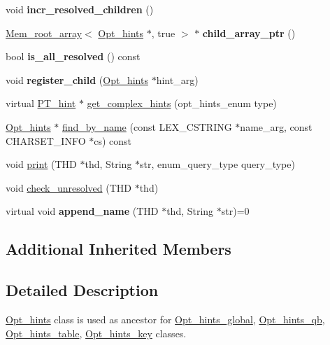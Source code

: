 \begin{DoxyCompactItemize}
\mbox{\label{classOpt__hints_a6f56b14236ddfad6efdac25e932c5cd7}} 
void {\bfseries incr\+\_\+resolved\+\_\+children} ()
\item 
\mbox{\label{classOpt__hints_af804e6f6d44aa881622d564b1e9028bd}} 
\mbox{\hyperlink{classMem__root__array}{Mem\+\_\+root\+\_\+array}}$<$ \mbox{\hyperlink{classOpt__hints}{Opt\+\_\+hints}} $\ast$, true $>$ $\ast$ {\bfseries child\+\_\+array\+\_\+ptr} ()
\item 
\mbox{\label{classOpt__hints_a2038b69f72475ff9dd2511b755eba38c}} 
bool {\bfseries is\+\_\+all\+\_\+resolved} () const
\item 
\mbox{\label{classOpt__hints_a7ee34cdc3e966883222b185f665b62ea}} 
void {\bfseries register\+\_\+child} (\mbox{\hyperlink{classOpt__hints}{Opt\+\_\+hints}} $\ast$hint\+\_\+arg)
\item 
virtual \mbox{\hyperlink{classPT__hint}{P\+T\+\_\+hint}} $\ast$ \mbox{\hyperlink{classOpt__hints_a3dd8eb290a7b81d9a6d849de18a61cba}{get\+\_\+complex\+\_\+hints}} (opt\+\_\+hints\+\_\+enum type)
\item 
\mbox{\hyperlink{classOpt__hints}{Opt\+\_\+hints}} $\ast$ \mbox{\hyperlink{classOpt__hints_a87c03b089de34abc1e119297e1126f42}{find\+\_\+by\+\_\+name}} (const L\+E\+X\+\_\+\+C\+S\+T\+R\+I\+NG $\ast$name\+\_\+arg, const C\+H\+A\+R\+S\+E\+T\+\_\+\+I\+N\+FO $\ast$cs) const
\item 
void \mbox{\hyperlink{classOpt__hints_a76b7bcc9463fc5fb053d22a56ca488be}{print}} (T\+HD $\ast$thd, String $\ast$str, enum\+\_\+query\+\_\+type query\+\_\+type)
\item 
void \mbox{\hyperlink{classOpt__hints_ab8841b8df145a91508a091c59046f162}{check\+\_\+unresolved}} (T\+HD $\ast$thd)
\item 
\mbox{\label{classOpt__hints_a8cdecb76130a9a3ce77055cbf2bafb0a}} 
virtual void {\bfseries append\+\_\+name} (T\+HD $\ast$thd, String $\ast$str)=0
\end{DoxyCompactItemize}
\subsection*{Additional Inherited Members}


\subsection{Detailed Description}
\mbox{\hyperlink{classOpt__hints}{Opt\+\_\+hints}} class is used as ancestor for \mbox{\hyperlink{classOpt__hints__global}{Opt\+\_\+hints\+\_\+global}}, \mbox{\hyperlink{classOpt__hints__qb}{Opt\+\_\+hints\+\_\+qb}}, \mbox{\hyperlink{classOpt__hints__table}{Opt\+\_\+hints\+\_\+table}}, \mbox{\hyperlink{classOpt__hints__key}{Opt\+\_\+hints\+\_\+key}} classes.

